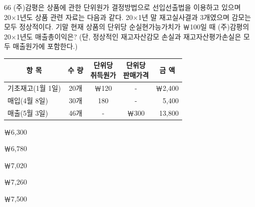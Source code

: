 \begin{question}{66}
(주)감평은 상품에 관한 단위원가 결정방법으로 선입선출법을 이용하고 있으며 20×1년도 상품 관련 자료는 다음과 같다. 20×1년 말 재고실사결과 3개였으며 감모는 모두 정상적이다. 기말 현재 상품의 단위당 순실현가능가치가 ￦100일 때 (주)감평의 20×1년도 매출총이익은? (단, 정상적인 재고자산감모 손실과 재고자산평가손실은 모두 매출원가에 포함한다.)

{\small\centering
\begin{tabular}{|c|c|c|c|r|}\hline
항 목 & 수 량 & \makecell{단위당\\취득원가} & \makecell{단위당\\판매가격} & \multicolumn{1}{c|}{금 액} \\ \hline
\multicolumn{1}{|l|}{기초재고(1월 1일)} & 20개 & ￦120 & - & ￦2,400 \\ \hline
\multicolumn{1}{|l|}{매입(4월 8일)} & 30개 & 180 & - & 5,400 \\ \hline
\multicolumn{1}{|l|}{매출(5월 3일)} & 46개 & - & ￦300 & 13,800 \\ \hline
\end{tabular}\par}
\begin{choices}
  \item ￦6,300
  \item ￦6,780
  \item ￦7,020
  \item ￦7,260
  \item ￦7,500
\end{choices}
\end{question}
